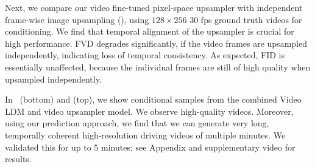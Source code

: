 Next, we compare our video fine-tuned pixel-space upsampler with independent frame-wise image upsampling (), using $128\times256$ 30 fps ground truth videos for conditioning. We find that temporal alignment of the upsampler is crucial for high performance. FVD degrades significantly, if the video frames are upsampled independently, indicating loss of temporal consistency. As expected, FID is essentially unaffected, because the individual frames are still of high quality when upsampled independently.

In~ (bottom) and  (top), we show conditional samples from the combined Video LDM and video upsampler model. We observe high-quality videos. Moreover, using our prediction approach, we find that we can generate very long, temporally coherent high-resolution driving videos of multiple minutes. We validated this for up to 5 minutes; see Appendix and supplementary video for results.

\begin{table}
    \vspace{-0.1cm}
    \centering
    \caption{\emph{Left:} Comparison with LVG on RDS; \emph{Right:}~Ablations.\vspace{-1em}}
    \label{tab:av_main}
    \hfill
    \vspace{-0.3em}
\end{table}


